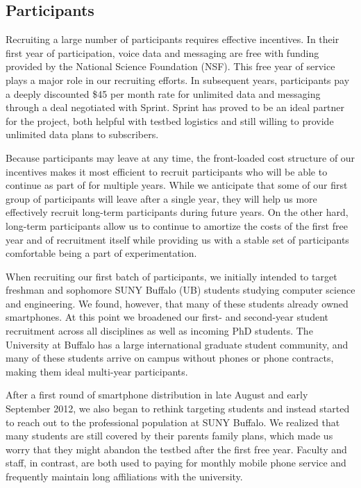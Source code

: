 \subsection{Participants}

Recruiting a large number of \PhoneLab{} participants requires effective
incentives. In their first year of \PhoneLab{} participation, voice data and
messaging are free with funding provided by the National Science Foundation
(NSF). This free year of service plays a major role in our recruiting
efforts. In subsequent years, participants pay a deeply discounted \$45 per
month rate for unlimited data and messaging through a deal negotiated with
Sprint. Sprint has proved to be an ideal partner for the \PhoneLab{} project,
both helpful with testbed logistics and still willing to provide unlimited
data plans to subscribers.

Because participants may leave at any time, the front-loaded cost structure
of our incentives makes it most efficient to recruit participants who will be
able to continue as part of \PhoneLab{} for multiple years. While we
anticipate that some of our first group of participants will leave after a
single year, they will help us more effectively recruit long-term
participants during future years. On the other hard, long-term participants
allow us to continue to amortize the costs of the first free year and of
recruitment itself while providing us with a stable set of participants
comfortable being a part of \PhoneLab{} experimentation.

When recruiting our first batch of participants, we initially intended to
target freshman and sophomore SUNY Buffalo (UB) students studying computer
science and engineering. We found, however, that many of these students
already owned smartphones. At this point we broadened our first- and
second-year student recruitment across all disciplines as well as incoming
PhD students. The University at Buffalo has a large international graduate
student community, and many of these students arrive on campus without phones
or phone contracts, making them ideal multi-year \PhoneLab{} participants.

After a first round of smartphone distribution in late August and early
September 2012, we also began to rethink targeting students and instead
started to reach out to the professional population at SUNY Buffalo. We
realized that many students are still covered by their parents family plans,
which made us worry that they might abandon the testbed after the first free
year. Faculty and staff, in contrast, are both used to paying for monthly
mobile phone service and frequently maintain long affiliations with the
university.

